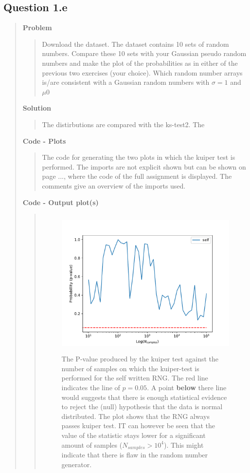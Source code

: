 
\subsection*{\textbf{Question 1.e}}
\begin{quote}

\textbf{Problem}
\begin{quote}
Download the dataset. The dataset contains 10 sets of random numbers. Compare these 10 sets with your Gaussian pseudo random numbers and make the plot of the probabilities as in either of the previous two exercises (your choice). Which random number arrays is/are consistent with a Gaussian random numbers with $\sigma = 1$ and $\mu 0$
\end{quote}

\textbf{Solution} 
\begin{quote}
The distirbutions are compared with the ks-test2. The 

\end{quote}

\textbf{Code - Plots}

\begin{quote}
The code for generating the two plots in which the kuiper test is performed. The imports are not explicit shown but can be shown on page ..., where the code of the full assignment is displayed. The comments give an overview of the imports used. 

\end{quote}

\textbf{Code - Output plot(s)}
\begin{quote}
\begin{figure}[!ht]
\centering
\includegraphics[width=12cm, height=7.5cm]{./Plots/1_plot_kuiper_test_self.pdf}
\caption{The P-value produced by the kuiper test against the number of samples on which the kuiper-test is performed for the self written RNG. The red line indicates the line of $ p = 0.05$. A point \textbf{below} there  line would suggests that there is enough statistical evidence to reject the (null) hypothesis that the data is normal distributed. The plot shows that the RNG always passes kuiper test. IT can however be seen that the value of the statistic stays lower for a significant amount of samples ($ N_{samples} > 10^4$). This might indicate that there is flaw in the random number generator.}
\end{figure}


\end{quote}
\end{quote}
